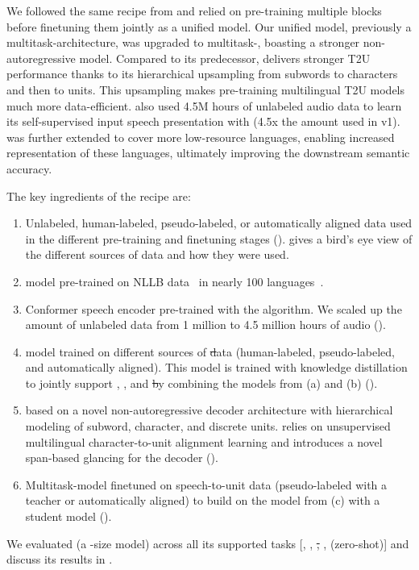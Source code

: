We followed the same recipe from \mfourt and relied on pre-training multiple blocks before finetuning them jointly as a unified model. 
Our unified model, previously a multitask-\unity architecture, was upgraded to multitask-\unitytwo, boasting a stronger non-autoregressive \tu model. Compared to its predecessor, \unitytwo delivers stronger T2U performance thanks to its hierarchical upsampling from subwords to characters and then to units. This upsampling makes pre-training multilingual T2U models much more data-efficient. \mfourttwo also used 4.5M hours of unlabeled audio data to learn its self-supervised input speech presentation with \wvbert (4.5x the amount used in v1). \seamlessalign was further extended to cover more low-resource languages, enabling increased representation of these languages, ultimately improving the downstream semantic accuracy.

The key ingredients of the \mfourttwo recipe are:
\begin{enumerate}[label=(\alph*)]

\item Unlabeled, human-labeled, pseudo-labeled, or automatically aligned data used in the different pre-training and finetuning stages ().  gives a bird's eye view of the different sources of data and how they were used.

\item \mt model pre-trained on NLLB data~\citep{nllb2022} in nearly 100 languages~\citep{SeamlessM4TArXiv}.
\item Conformer speech encoder pre-trained with the \wvbert algorithm.
We scaled up the amount of unlabeled data from 1 million to 4.5 million hours of audio ().
\item \xt model trained on different sources of \st data (human-labeled, pseudo-labeled, and automatically aligned). This model is trained with knowledge distillation to jointly support \mt, \asr, and \st by combining the models from (a) and (b) ().
\item \unitytwo based on a novel non-autoregressive \tu decoder architecture with hierarchical modeling of subword, character, and discrete units. \unitytwo relies on unsupervised multilingual character-to-unit alignment learning and introduces a novel span-based glancing for the \tu decoder  ().
\item Multitask-\unitytwo model finetuned on speech-to-unit data (pseudo-labeled with a teacher \tu or automatically aligned) to build on the model from (c) with a student \tu model ().
\end{enumerate}
We evaluated \mfourtlgtwo (a \sizelg-size model) across all its supported tasks [\asr, \mt, \st, \sst, \ttst (zero-shot)] and discuss its results in .


